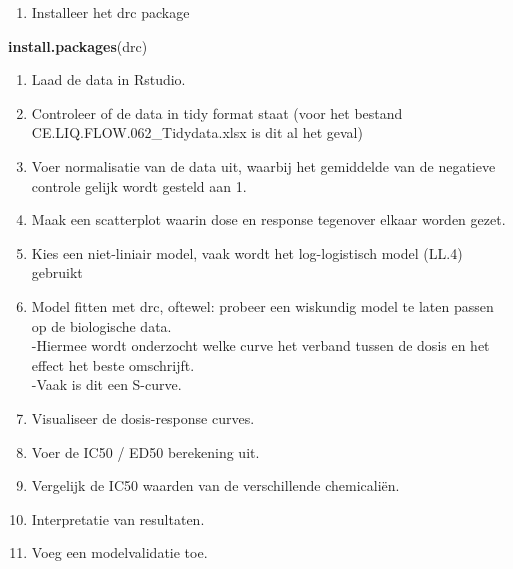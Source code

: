 \documentclass[
]{book}
\newenvironment{Shaded}{\begin{snugshade}}{\end{snugshade}}
\newcommand{\FunctionTok}[1]{\textcolor[rgb]{0.13,0.29,0.53}{\textbf{#1}}}
\newcommand{\NormalTok}[1]{#1}
\providecommand{\tightlist}{%
  \setlength{\itemsep}{0pt}\setlength{\parskip}{0pt}}
\begin{document}
\begin{enumerate}
\def\labelenumi{\arabic{enumi}.}
\tightlist
\item
  Installeer het drc package
\end{enumerate}

\begin{Shaded}
\begin{Highlighting}[]
\FunctionTok{install.packages}\NormalTok{(drc)}
\end{Highlighting}
\end{Shaded}

\begin{enumerate}
\def\labelenumi{\arabic{enumi}.}
\setcounter{enumi}{1}
\tightlist
\item
  Laad de data in Rstudio.\\
\item
  Controleer of de data in tidy format staat (voor het bestand CE.LIQ.FLOW.062\_Tidydata.xlsx is dit al het geval)\\
\item
  Voer normalisatie van de data uit, waarbij het gemiddelde van de negatieve controle gelijk wordt gesteld aan 1.\\
\item
  Maak een scatterplot waarin dose en response tegenover elkaar worden gezet.\\
\item
  Kies een niet-liniair model, vaak wordt het log-logistisch model (LL.4) gebruikt\\
\item
  Model fitten met drc, oftewel: probeer een wiskundig model te laten passen op de biologische data.\\
  -Hiermee wordt onderzocht welke curve het verband tussen de dosis en het effect het beste omschrijft.\\
  -Vaak is dit een S-curve.\\
\item
  Visualiseer de dosis-response curves.\\
\item
  Voer de IC50 / ED50 berekening uit.\\
\item
  Vergelijk de IC50 waarden van de verschillende chemicaliën.\\
\item
  Interpretatie van resultaten.\\
\item
  Voeg een modelvalidatie toe.
\end{enumerate}
\end{document}
